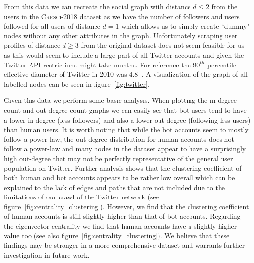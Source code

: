 From this data we can recreate the social graph with distance $d\leq2$ from the users in the \textsc{Cresci-2018} dataset as we have the number of followers and users followed for all users of distance $d=1$ which allows us to simply create ``dummy" nodes without any other attributes in the graph. Unfortunately scraping user profiles of distance $d\geq3$ from the original dataset does not seem feasible for us as this would seem to include a large part of all Twitter accounts and given the Twitter API restrictions might take months. For reference the $90^{th}$-percentile effective diameter of Twitter in 2010 was 4.8~\cite{kwak2010twitter}. A visualization of the graph of all labelled nodes can be seen in figure~\ref{fig:twitter}.

Given this data we perform some basic analysis. When plotting the in-degree-count and out-degree-count graphs we can easily see that bot users tend to have a lower in-degree (less followers) and also a lower out-degree (following less users) than human users. It is worth noting that while the bot accounts seem to mostly follow a power-law, the out-degree distribution for human accounts does not follow a power-law and many nodes in the dataset appear to have a surprisingly high out-degree that may not be perfectly representative of the general user population on Twitter. Further analysis shows that the clustering coefficient of both human and bot accounts appears to be rather low overall which can be explained to the lack of edges and paths that are not included due to the limitations of our crawl of the Twitter network (see figure~\ref{fig:centrality_clustering}). However, we find that the clustering coefficient of human accounts is still slightly higher than that of bot accounts. Regarding the eigenvector centrality we find that human accounts have a slightly higher value too (see also figure~\ref{fig:centrality_clustering}). We believe that these findings may be stronger in a more comprehensive dataset and warrants further investigation in future work.

